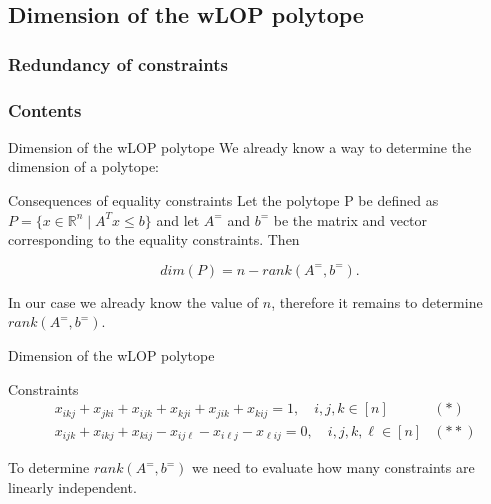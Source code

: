 \documentclass[xcolor=dvipsnames]{beamer}
\numberwithin{bsp}{section}
\numberwithin{figure}{section}
\begin{document}
\subsection{Dimension of the wLOP polytope}

\subsubsection{Redundancy of constraints}
\begin{frame}[plain]
	\frametitle{Contents}
	\linespread{1.1}
	\tableofcontents[currentsubsection]
\end{frame}

\begin{frame}{Dimension of the wLOP polytope}
	We already know a way to determine the dimension of a polytope:
	
	\begin{block}{Consequences of equality constraints}
		Let the polytope P be defined as $P=\{x \in \mathbb{R}^{n}\mid A^{T}x \leq b \}$ and let $A^{=} $ and $b^{=}$ be the matrix and vector corresponding to the equality constraints. Then
		
		\begin{equation*}
		dim(P) = n - rank(A^{=},b^{=}).
		\end{equation*}
		
		\vspace{10 pt}
	\end{block}

	In our case we already know the value of $n$, therefore it remains to determine $rank(A^{=},b^{=})$.
\end{frame}

\begin{frame}{Dimension of the wLOP polytope}	
	\begin{block}{Constraints}
		\vspace{-0.5cm}
		\begin{align*}
		&x_{ikj} + x_{jki} + x_{ijk} + x_{kji} + x_{jik} + x_{kij} = 1, \quad i, j, k \in [n] &(*)\\
		&x_{ijk} + x_{ikj} + x_{kij} - x_{ij\ell} - x_{i\ell j} - x_{\ell ij} = 0, \quad i, j, k, \ell \in [n] &(**)
		\end{align*}
	\end{block}
	\vspace{10 pt}
    To determine $rank(A^{=},b^{=})$ we need to evaluate how many constraints are linearly independent.
\end{frame}
\end{document}
